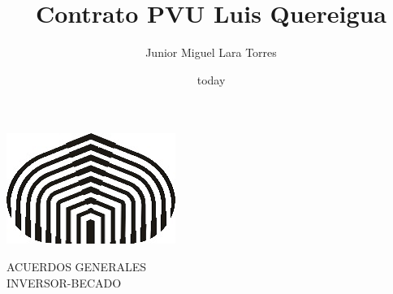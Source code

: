 \documentclass[a4paper,12pt]{article}
\title{Contrato PVU Luis Quereigua}
\author{Junior Miguel Lara Torres}
\date{today}
\begin{document}
\begin{center}
\par \includegraphics[scale=1]{USB} \par
ACUERDOS GENERALES \\INVERSOR-BECADO \\
\end{center}
\end{document}

